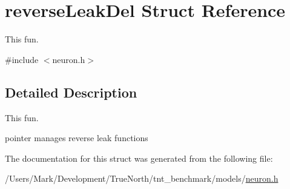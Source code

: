 \hypertarget{structreverse_leak_del}{}\section{reverse\+Leak\+Del Struct Reference}
\label{structreverse_leak_del}


This fun.  




{\ttfamily \#include $<$neuron.\+h$>$}



\subsection{Detailed Description}
This fun. 

pointer manages reverse leak functions 

The documentation for this struct was generated from the following file\+:\begin{DoxyCompactItemize}
\item 
/\+Users/\+Mark/\+Development/\+True\+North/tnt\+\_\+benchmark/models/\hyperlink{neuron_8h}{neuron.\+h}\end{DoxyCompactItemize}
